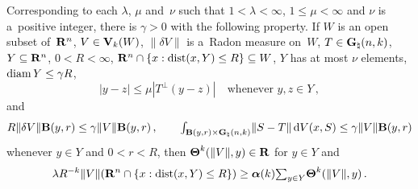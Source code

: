 \begin{theorem}
    \label{al:6.2}
    Corresponding to each $\lambda$, $\mu$ and~$\nu$ such that $1 < \lambda < \infty$, $1 \le \mu
    < \infty$ and $\nu$ is a~positive integer, there is $\gamma > 0$ with the following property.
    If $W$ is an open subset of~$\mathbf{R}^{n}$, $V \in \mathbf{V}_{k}(W)$, $\|\delta V\|$ is a~Radon
    measure on~$W$, $T \in \mathbf{G}_{\natural}(n,k)$, $Y \subseteq \mathbf{R}^{n}$, $0 < R < \infty$,
    $\mathbf{R}^{n} \cap \{ x : \operatorname{dist}(x,Y) \le R \} \subseteq W$, $Y$ has at most $\nu$ elements,
    $\operatorname{diam} Y \le \gamma R$,
    \begin{displaymath}
        |y - z| \le \mu |T^\perp(y - z)| \quad \text{whenever $y, z \in Y$} \,,
    \end{displaymath}
    and
    \begin{displaymath}
        R \|\delta V\| \mathbf{B}(y,r) \le \gamma \|V\| \mathbf{B}(y,r) \,, \qquad
        {\textstyle\int_{\mathbf{B}(y,r) \times \mathbf{G}_{\natural}(n,k)}^{}} \|S - T\| \,\mathrm{d} V(x,S) \le \gamma
        \|V\| \mathbf{B}(y,r)
    \end{displaymath}
    whenever $y \in Y$ and $0 < r < R$, then $\boldsymbol{\Theta}^{k}(\|V\|,y) \in \mathbf{R}$ for $y \in Y$ and
    \begin{displaymath}
        \lambda R^{-k} \|V\|(\mathbf{R}^{n} \cap \{ x : \operatorname{dist}(x,Y) \le R \}) \ge
        \boldsymbol{\alpha}(k) {\textstyle\sum_{y \in Y}^{}} \boldsymbol{\Theta}^{k}(\|V\|,y) \,.
    \end{displaymath}
\end{theorem}

